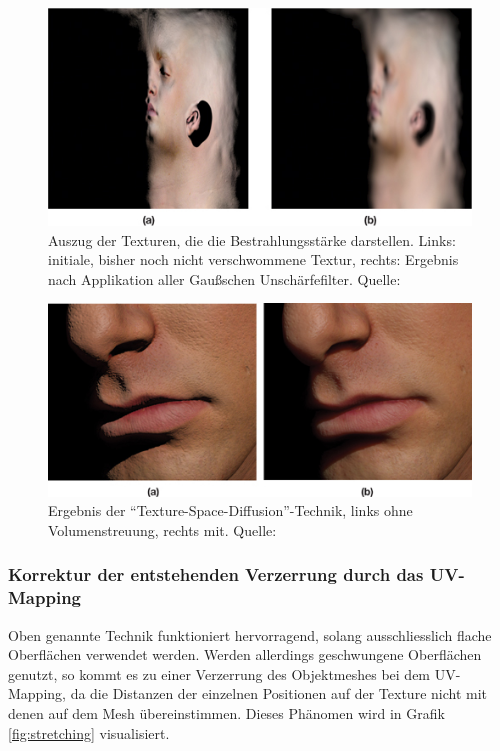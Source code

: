 \documentclass[ngerman,runningheads,a4paper]{llncs}[2018/03/10]
\begin{document}
\begin{figure}
  \centering
  \includegraphics[scale=0.8,keepaspectratio]{./images/irradiance-texture-adrian.jpg}
  \caption{Auszug der Texturen, die die Bestrahlungsstärke darstellen. Links: initiale, bisher noch nicht verschwommene Textur, rechts: Ergebnis nach Applikation aller Gaußschen Unschärfefilter. Quelle: \cite{advanced-realtime-skin-rendering}}
\end{figure}

\begin{figure}
  \centering
  \includegraphics[scale=0.8,keepaspectratio]{./images/skin-rendering-with-without-sss.jpg}
  \caption{Ergebnis der \enquote{Texture-Space-Diffusion}-Technik, links ohne Volumenstreuung, rechts mit. Quelle: \cite{efficient-human-skin-rendering}}
  \label{fig:outlook-final-result-no-sss}
\end{figure}

\subsubsection{Korrektur der entstehenden Verzerrung durch das UV-Mapping}

Oben genannte Technik funktioniert hervorragend, solang ausschliesslich flache Oberflächen verwendet werden.
Werden allerdings geschwungene Oberflächen genutzt, so kommt es zu einer Verzerrung des Objektmeshes bei dem UV-Mapping, da die Distanzen der einzelnen Positionen auf der Texture nicht mit denen auf dem Mesh übereinstimmen.
Dieses Phänomen wird in Grafik \ref{fig:stretching} visualisiert.
\end{document}
